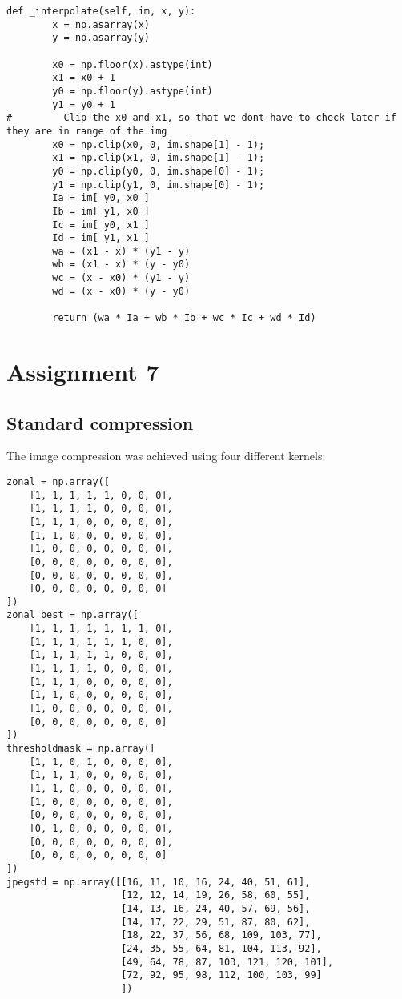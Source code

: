 \begin{verbatim}
def _interpolate(self, im, x, y):
        x = np.asarray(x)
        y = np.asarray(y)
    
        x0 = np.floor(x).astype(int)
        x1 = x0 + 1
        y0 = np.floor(y).astype(int)
        y1 = y0 + 1
#         Clip the x0 and x1, so that we dont have to check later if they are in range of the img
        x0 = np.clip(x0, 0, im.shape[1] - 1);
        x1 = np.clip(x1, 0, im.shape[1] - 1);
        y0 = np.clip(y0, 0, im.shape[0] - 1);
        y1 = np.clip(y1, 0, im.shape[0] - 1);
        Ia = im[ y0, x0 ]
        Ib = im[ y1, x0 ]
        Ic = im[ y0, x1 ]
        Id = im[ y1, x1 ]
        wa = (x1 - x) * (y1 - y)
        wb = (x1 - x) * (y - y0)
        wc = (x - x0) * (y1 - y)
        wd = (x - x0) * (y - y0)
        
        return (wa * Ia + wb * Ib + wc * Ic + wd * Id)
\end{verbatim}



\section{Assignment 7}

\subsection{Standard compression}
The image compression was achieved using four different kernels:
\begin{verbatim}
zonal = np.array([
    [1, 1, 1, 1, 1, 0, 0, 0],
    [1, 1, 1, 1, 0, 0, 0, 0],
    [1, 1, 1, 0, 0, 0, 0, 0],
    [1, 1, 0, 0, 0, 0, 0, 0],
    [1, 0, 0, 0, 0, 0, 0, 0],
    [0, 0, 0, 0, 0, 0, 0, 0],
    [0, 0, 0, 0, 0, 0, 0, 0],
    [0, 0, 0, 0, 0, 0, 0, 0]
])
zonal_best = np.array([
    [1, 1, 1, 1, 1, 1, 1, 0],
    [1, 1, 1, 1, 1, 1, 0, 0],
    [1, 1, 1, 1, 1, 0, 0, 0],
    [1, 1, 1, 1, 0, 0, 0, 0],
    [1, 1, 1, 0, 0, 0, 0, 0],
    [1, 1, 0, 0, 0, 0, 0, 0],
    [1, 0, 0, 0, 0, 0, 0, 0],
    [0, 0, 0, 0, 0, 0, 0, 0]
])
thresholdmask = np.array([
    [1, 1, 0, 1, 0, 0, 0, 0],
    [1, 1, 1, 0, 0, 0, 0, 0],
    [1, 1, 0, 0, 0, 0, 0, 0],
    [1, 0, 0, 0, 0, 0, 0, 0],
    [0, 0, 0, 0, 0, 0, 0, 0],
    [0, 1, 0, 0, 0, 0, 0, 0],
    [0, 0, 0, 0, 0, 0, 0, 0],
    [0, 0, 0, 0, 0, 0, 0, 0]
])
jpegstd = np.array([[16, 11, 10, 16, 24, 40, 51, 61],
                    [12, 12, 14, 19, 26, 58, 60, 55],
                    [14, 13, 16, 24, 40, 57, 69, 56],
                    [14, 17, 22, 29, 51, 87, 80, 62],
                    [18, 22, 37, 56, 68, 109, 103, 77],
                    [24, 35, 55, 64, 81, 104, 113, 92],
                    [49, 64, 78, 87, 103, 121, 120, 101],
                    [72, 92, 95, 98, 112, 100, 103, 99]
                    ])
\end{verbatim}

